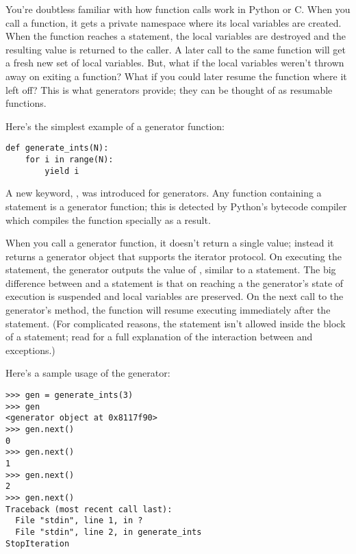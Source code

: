 \documentclass{howto}
\begin{document}
You're doubtless familiar with how function calls work in Python or C.
When you call a function, it gets a private namespace where its local
variables are created.  When the function reaches a 
statement, the local variables are destroyed and the resulting value
is returned to the caller.  A later call to the same function will get
a fresh new set of local variables. But, what if the local variables
weren't thrown away on exiting a function?  What if you could later
resume the function where it left off?  This is what generators
provide; they can be thought of as resumable functions.

Here's the simplest example of a generator function:

\begin{verbatim}
def generate_ints(N):
    for i in range(N):
        yield i
\end{verbatim}

A new keyword, , was introduced for generators.  Any
function containing a  statement is a generator
function; this is detected by Python's bytecode compiler which
compiles the function specially as a result.  

When you call a generator function, it doesn't return a single value;
instead it returns a generator object that supports the iterator
protocol.  On executing the  statement, the generator
outputs the value of , similar to a 
statement.  The big difference between  and a
 statement is that on reaching a  the
generator's state of execution is suspended and local variables are
preserved.  On the next call to the generator's  method,
the function will resume executing immediately after the
 statement.  (For complicated reasons, the
 statement isn't allowed inside the  block
of a  statement; read  for a full
explanation of the interaction between  and
exceptions.)

Here's a sample usage of the  generator:

\begin{verbatim}
>>> gen = generate_ints(3)
>>> gen
<generator object at 0x8117f90>
>>> gen.next()
0
>>> gen.next()
1
>>> gen.next()
2
>>> gen.next()
Traceback (most recent call last):
  File "stdin", line 1, in ?
  File "stdin", line 2, in generate_ints
StopIteration
\end{verbatim}
\end{document}
